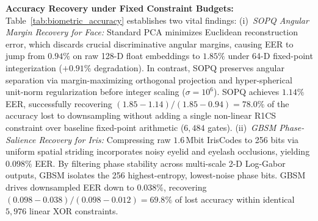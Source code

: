 \documentclass[10pt,letterpaper,journal]{IEEEtran}
\begin{document}
\begin{table}[t]
\centering
\caption{Biometric Accuracy Comparison Across Raw Features, Baseline Downsampling, and Proposed Circuit-Optimized Encodings}
\label{tab:biometric_accuracy}
\setlength{\tabcolsep}{4.5pt}
\renewcommand{\arraystretch}{1.20}
\vspace{2pt}\par{}
\end{table}

\textbf{Accuracy Recovery under Fixed Constraint Budgets:}
Table~\ref{tab:biometric_accuracy} establishes two vital findings:
(i)~\emph{SOPQ Angular Margin Recovery for Face:} Standard PCA minimizes Euclidean reconstruction error, which discards crucial discriminative angular margins, causing EER to jump from $0.94\%$ on raw 128-D float embeddings to $1.85\%$ under 64-D fixed-point integerization ($+0.91\%$ degradation). In contrast, SOPQ preserves angular separation via margin-maximizing orthogonal projection and hyper-spherical unit-norm regularization before integer scaling ($\sigma=10^6$). SOPQ achieves $1.14\%$ EER, successfully recovering $(1.85 - 1.14) / (1.85 - 0.94) = \mathbf{78.0\%}$ of the accuracy lost to downsampling without adding a single non-linear R1CS constraint over baseline fixed-point arithmetic ($6,484$ gates).
(ii)~\emph{GBSM Phase-Salience Recovery for Iris:} Compressing raw $1.6\,$Mbit IrisCodes to 256 bits via uniform spatial striding incorporates noisy eyelid and eyelash occlusions, yielding $0.098\%$ EER. By filtering phase stability across multi-scale 2-D Log-Gabor outputs, GBSM isolates the 256 highest-entropy, lowest-noise phase bits. GBSM drives downsampled EER down to $0.038\%$, recovering $(0.098 - 0.038) / (0.098 - 0.012) = \mathbf{69.8\%}$ of lost accuracy within identical $5,976$ linear XOR constraints.
\end{document}
